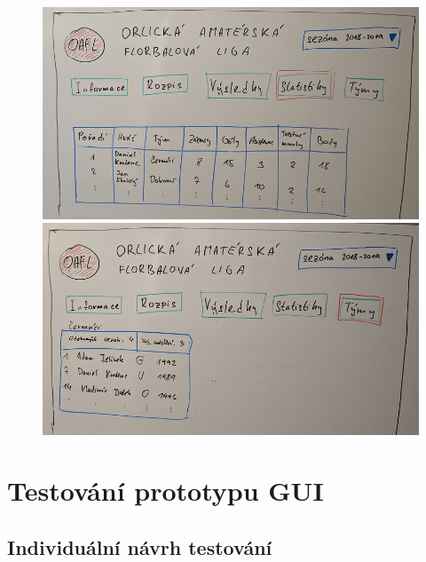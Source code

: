 \documentclass[11pt, a4paper, titlepage]{article}
\begin{document}
\begin{figure}[htp]
\centering
    \begin{minipage}{.5\textwidth}
        \centering
        \includegraphics[width=.98\textwidth]{images/draft-05.png}
    \end{minipage}%
    \begin{minipage}{.5\textwidth}
        \centering
        \includegraphics[width=.98\textwidth]{images/draft-06.png}
    \end{minipage}
\end{figure}


\newpage

\section{Testování prototypu GUI}

\subsection{Individuální návrh testování}
\end{document}
